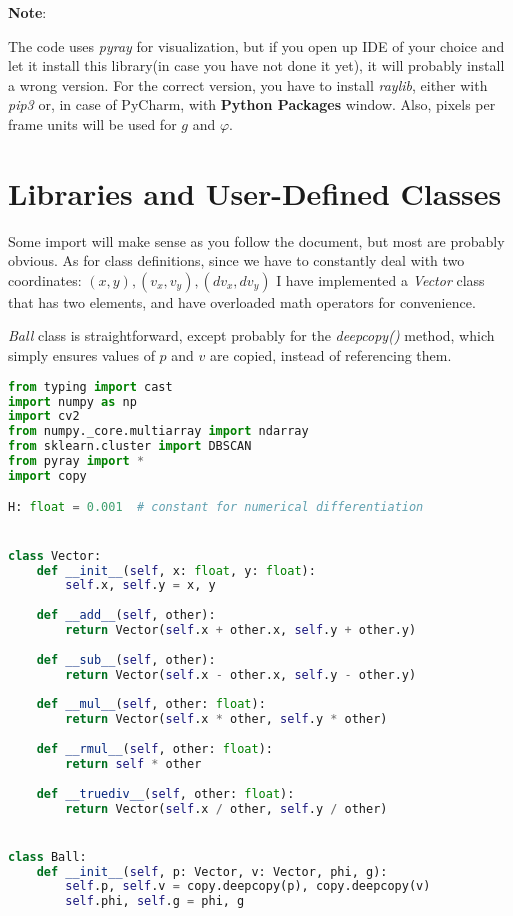 \documentclass{article}
\begin{document}
	\textbf{Note}: 
	
	The code uses \textit{pyray} for visualization, but if you open up IDE of your choice and let it install this library(in case you have not done it yet), it will probably install a wrong version. For the correct version, you have to install \textit{raylib}, either with \textit{pip3} or, in case of PyCharm, with \textbf{Python Packages} window. Also, pixels per frame units will be used for $g$ and $\varphi$.
	
	\section*{Libraries and User-Defined Classes}
	
	Some import will make sense as you follow the document, but most are probably obvious. As for class definitions, since we have to constantly deal with two coordinates: $(x, y), (v_x, v_y), (dv_x, dv_y)$ I have implemented a \textit{Vector} class that has two elements, and have overloaded math operators for convenience. 
	
	 \textit{Ball} class is straightforward, except probably for the \textit{deepcopy()} method, which simply ensures values of $p$ and $v$ are copied, instead of referencing them. \\
	\begin{lstlisting}[language=python]
from typing import cast
import numpy as np
import cv2
from numpy._core.multiarray import ndarray
from sklearn.cluster import DBSCAN
from pyray import *
import copy

H: float = 0.001  # constant for numerical differentiation


class Vector:
	def __init__(self, x: float, y: float):
		self.x, self.y = x, y
	
	def __add__(self, other):
		return Vector(self.x + other.x, self.y + other.y)
	
	def __sub__(self, other):
		return Vector(self.x - other.x, self.y - other.y)
	
	def __mul__(self, other: float):
		return Vector(self.x * other, self.y * other)
	
	def __rmul__(self, other: float):
		return self * other
	
	def __truediv__(self, other: float):
		return Vector(self.x / other, self.y / other)


class Ball:
	def __init__(self, p: Vector, v: Vector, phi, g):
		self.p, self.v = copy.deepcopy(p), copy.deepcopy(v)
		self.phi, self.g = phi, g\end{lstlisting}
	
\end{document}
